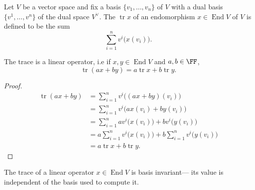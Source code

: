 \documentclass{article}
\DeclareMathOperator{\End}{End}
\DeclareMathOperator{\tr}{tr}
\begin{document}
\begin{definition}
    Let $V$ be a vector space and fix a basis $\{v_1,\ldots,v_n\}$ of $V$ with a dual basis $\{v^1, \ldots, v^n\}$ of the dual space $V^\vee$.
    The  $\tr x$ of an endomorphism $x \in \End V$ of $V$ is defined to be the sum
    \[
        \sum_{i=1}^n 
        v^i\Big(x(v_i)\Big).
    \]
\end{definition}

\begin{theorem}
    The trace is a linear operator, i.e if $x, y \in \End V$ and $a,b \in \FF$,
    \[
        \tr(ax + by)
        =
        a\tr x + b \tr y.
    \]
\end{theorem}
\begin{proof}
    \begin{align*}
        \tr (ax + by)
        &=
        \sum_{i=1}^n 
        v^i\Big((ax + by)(v_i)\Big)
        \\
        &=
        \sum_{i=1}^n 
        v^i\Big(ax(v_i) + by(v_i)\Big)
        \\
        &=
        \sum_{i=1}^n 
        av^i\Big(x(v_i)\Big)
        + bv^i\Big(y(v_i)\Big)
        \\
        &=
        a
        \sum_{i=1}^n 
        v^i\Big(x(v_i)\Big)
        + 
        b
        \sum_{i=1}^n 
        v^i\Big(y(v_i)\Big)
        \\
        &=
        a \tr x + b \tr y.
    \end{align*}
\end{proof}

\begin{theorem}\label{thm:TraceIsBasisIndependent}
    The trace of a linear operator $x \in \End V$ is basis invariant--- its value is independent of the basis used to compute it.
\end{theorem}
\end{document}
